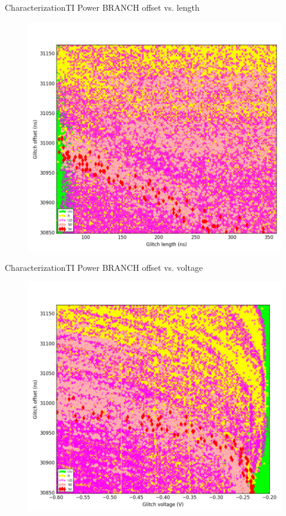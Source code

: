 \documentclass[table]{beamer}
\begin{document}
\begin{frame}{Characterization}{TI Power BRANCH offset vs. length}
    \vspace{-.3cm}
    \begin{figure}[H]
      \centering
      \includegraphics[width=.7\textwidth]{../../plots/newplots/ti-auth-length-offset.png}
    \end{figure}
\end{frame}

\begin{frame}{Characterization}{TI Power BRANCH offset vs. voltage}
    \vspace{-.3cm}
    \begin{figure}[H]
      \centering
      \includegraphics[width=.7\textwidth]{../../plots/newplots/ti-auth-voltage-offset.png}
    \end{figure}
\end{frame}
\end{document}
